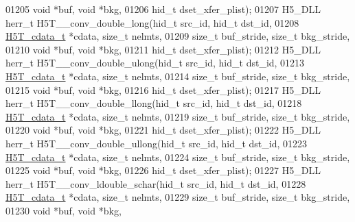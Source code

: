 \begin{DoxyCode}
01205                                      \textcolor{keywordtype}{void} *buf, \textcolor{keywordtype}{void} *bkg,
01206                                      hid\_t dset\_xfer\_plist);
01207 H5\_DLL herr\_t H5T\_\_conv\_double\_long(hid\_t src\_id, hid\_t dst\_id,
01208                      \hyperlink{struct_h5_t__cdata__t}{H5T\_cdata\_t} *cdata, \textcolor{keywordtype}{size\_t} nelmts,
01209                      \textcolor{keywordtype}{size\_t} buf\_stride, \textcolor{keywordtype}{size\_t} bkg\_stride,
01210                                      \textcolor{keywordtype}{void} *buf, \textcolor{keywordtype}{void} *bkg,
01211                                      hid\_t dset\_xfer\_plist);
01212 H5\_DLL herr\_t H5T\_\_conv\_double\_ulong(hid\_t src\_id, hid\_t dst\_id,
01213                      \hyperlink{struct_h5_t__cdata__t}{H5T\_cdata\_t} *cdata, \textcolor{keywordtype}{size\_t} nelmts,
01214                      \textcolor{keywordtype}{size\_t} buf\_stride, \textcolor{keywordtype}{size\_t} bkg\_stride,
01215                                      \textcolor{keywordtype}{void} *buf, \textcolor{keywordtype}{void} *bkg,
01216                                      hid\_t dset\_xfer\_plist);
01217 H5\_DLL herr\_t H5T\_\_conv\_double\_llong(hid\_t src\_id, hid\_t dst\_id,
01218                      \hyperlink{struct_h5_t__cdata__t}{H5T\_cdata\_t} *cdata, \textcolor{keywordtype}{size\_t} nelmts,
01219                      \textcolor{keywordtype}{size\_t} buf\_stride, \textcolor{keywordtype}{size\_t} bkg\_stride,
01220                                      \textcolor{keywordtype}{void} *buf, \textcolor{keywordtype}{void} *bkg,
01221                                      hid\_t dset\_xfer\_plist);
01222 H5\_DLL herr\_t H5T\_\_conv\_double\_ullong(hid\_t src\_id, hid\_t dst\_id,
01223                      \hyperlink{struct_h5_t__cdata__t}{H5T\_cdata\_t} *cdata, \textcolor{keywordtype}{size\_t} nelmts,
01224                      \textcolor{keywordtype}{size\_t} buf\_stride, \textcolor{keywordtype}{size\_t} bkg\_stride,
01225                                      \textcolor{keywordtype}{void} *buf, \textcolor{keywordtype}{void} *bkg,
01226                                      hid\_t dset\_xfer\_plist);
01227 H5\_DLL herr\_t H5T\_\_conv\_ldouble\_schar(hid\_t src\_id, hid\_t dst\_id,
01228                      \hyperlink{struct_h5_t__cdata__t}{H5T\_cdata\_t} *cdata, \textcolor{keywordtype}{size\_t} nelmts,
01229                      \textcolor{keywordtype}{size\_t} buf\_stride, \textcolor{keywordtype}{size\_t} bkg\_stride,
01230                                      \textcolor{keywordtype}{void} *buf, \textcolor{keywordtype}{void} *bkg,

\end{DoxyCode}
